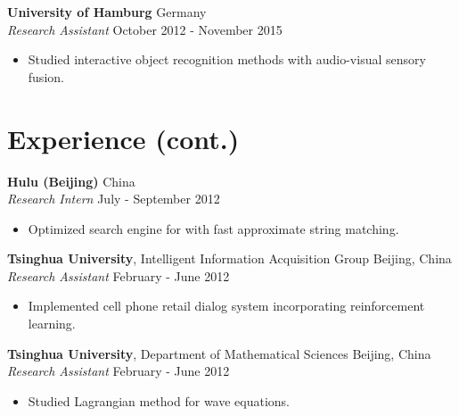 \documentclass[a4paper,10pt]{article} %
\begin{document}

\textbf{University of Hamburg} \hfill Germany \\
\textit{Research Assistant}  \hfill October 2012 - November 2015
\vspace{-.9\parskip}
\begin{itemize}
  \item Studied interactive object recognition methods with audio-visual sensory fusion.
\end{itemize}


\pagebreak


\section*{Experience (cont.)}

\textbf{Hulu (Beijing)} \hfill China \\
\textit{Research Intern} \hfill July - September 2012
\vspace{-.9\parskip}
\begin{itemize}
  \item Optimized search engine for with fast approximate string matching.
\end{itemize}


\iffalse

\textbf{Tsinghua University}, Intelligent Information Acquisition Group \hfill Beijing, China \\
\textit{Research Assistant} \hfill February - June 2012
\vspace{-\parskip}
\begin{itemize}
  \item Implemented cell phone retail dialog system incorporating reinforcement learning.
\end{itemize}


\textbf{Tsinghua University}, Department of Mathematical Sciences \hfill Beijing, China \\
\textit{Research Assistant} \hfill February - June 2012
\vspace{-\parskip}
\begin{itemize}
  \item Studied Lagrangian method for wave equations.
\end{itemize}
\end{document}
